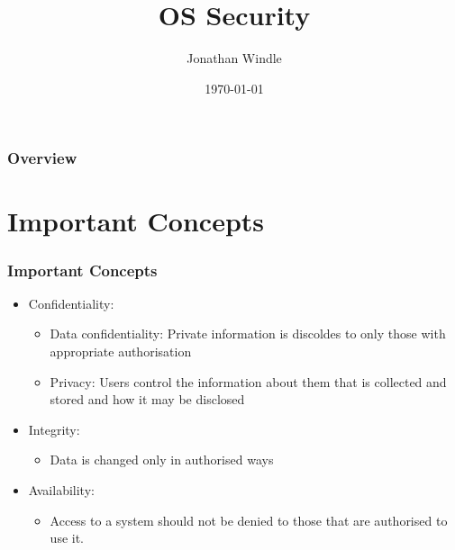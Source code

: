 \documentclass{beamer}
\title[OS Security]{OS Security} %
\author{Jonathan Windle} %
\institute[UEA] %
{
University of East Anglia \\ %
\medskip
\textit{J.Windle@uea.ac.uk} %
}
\date{\today} %
\begin{document}
\begin{frame}
\titlepage %
\end{frame}

\begin{frame}[allowframebreaks]
\frametitle{Overview} %
\tableofcontents %
\end{frame}

\section{Important Concepts}
\begin{frame}
\frametitle{Important Concepts}
\begin{itemize}
\item Confidentiality:
\begin{itemize}
\item Data confidentiality: Private information is discoldes to only those with appropriate authorisation
\item Privacy: Users control the information about them that is collected and stored and how it may be disclosed
\end{itemize}
\item Integrity:
\begin{itemize}
\item Data is changed only in authorised ways
\end{itemize}
\item Availability:
\begin{itemize}
\item Access to a system should not be denied to those that are authorised to use it.
\end{itemize}
\end{itemize}
\end{frame}
\end{document}
